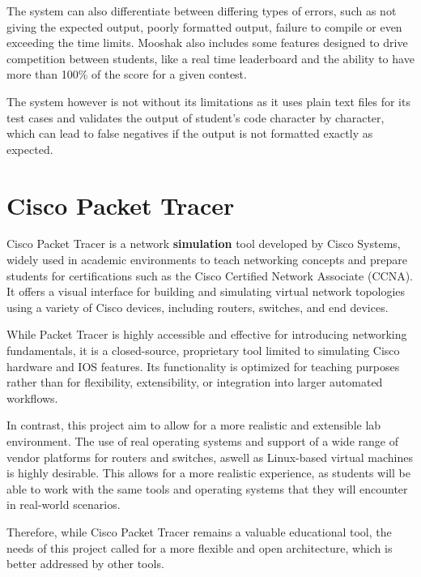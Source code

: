 The system can also differentiate between differing types of errors, such as not giving the expected output, poorly 
formatted output, failure to compile or even exceeding the time limits.
Mooshak also includes some features designed to drive competition between students, like a real time leaderboard and
the ability to have more than 100\% of the score for a given contest.

The system however is not without its limitations as it uses plain text files for its test cases and validates the output 
of student's code character by character, which can lead to false negatives if the output is not formatted exactly as
expected.

\section{Cisco Packet Tracer}

Cisco Packet Tracer is a network \textbf{simulation} tool developed by Cisco Systems, widely used in academic environments 
to teach networking concepts and prepare students for certifications such as the Cisco Certified Network Associate (CCNA). 
It offers a visual interface for building and simulating virtual network topologies using a variety of Cisco devices, 
including routers, switches, and end devices.

While Packet Tracer is highly accessible and effective for introducing networking fundamentals, it is a closed-source, 
proprietary tool limited to simulating Cisco hardware and IOS features. Its functionality is optimized for teaching 
purposes rather than for flexibility, extensibility, or integration into larger automated workflows.

In contrast, this project aim to allow for a more realistic and extensible lab environment. The use of real operating 
systems and support of a wide range of vendor platforms for routers and switches, aswell as Linux-based virtual machines 
is highly desirable. This allows for a more realistic experience, as students will be able to work with the same tools and 
operating systems that they will encounter in real-world scenarios.

Therefore, while Cisco Packet Tracer remains a valuable educational tool, the needs of this project called for a more 
flexible and open architecture, which is better addressed by other tools.